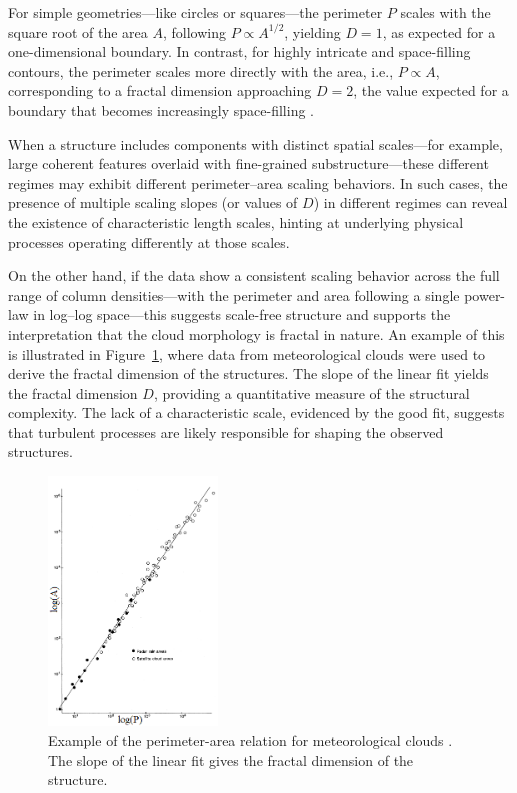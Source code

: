 For simple geometries—like circles or squares—the perimeter \( P \) scales with the square root of the area \( A \), following \( P \propto A^{1/2} \), yielding \( D = 1 \), as expected for a one-dimensional boundary. In contrast, for highly intricate and space-filling contours, the perimeter scales more directly with the area, i.e., \( P \propto A \), corresponding to a fractal dimension approaching \( D = 2 \), the value expected for a boundary that becomes increasingly space-filling \cite{lovejoy1982area}.

When a structure includes components with distinct spatial scales—for example, large coherent features overlaid with fine-grained substructure—these different regimes may exhibit different perimeter–area scaling behaviors. In such cases, the presence of multiple scaling slopes (or values of \( D \)) in different regimes can reveal the existence of characteristic length scales, hinting at underlying physical processes operating differently at those scales.

On the other hand, if the data show a consistent scaling behavior across the full range of column densities—with the perimeter and area following a single power-law in log–log space—this suggests scale-free structure and supports the interpretation that the cloud morphology is fractal in nature. An example of this is illustrated in Figure~\ref{fig:perimeter_area_example}, where data from meteorological clouds were used to derive the fractal dimension of the structures. The slope of the linear fit yields the fractal dimension $D$, providing a quantitative measure of the structural complexity. The lack of a characteristic scale, evidenced by the good fit, suggests that turbulent processes are likely responsible for shaping the observed structures.

\begin{figure}[t]
    \centering
    \includegraphics[width=0.4\textwidth]{figures/lovejoy.png}
    \caption{Example of the perimeter-area relation for meteorological clouds \cite{lovejoy1982area}. The slope of the linear fit gives the fractal dimension of the structure.}
    \label{fig:perimeter_area_example}
\end{figure}


